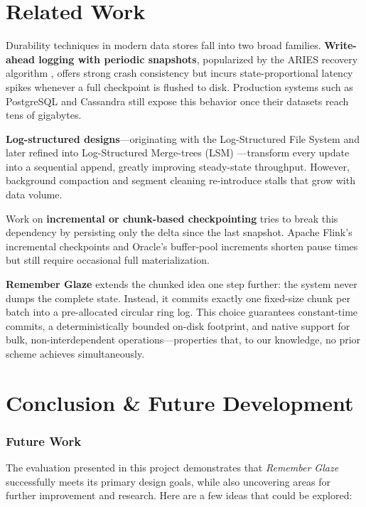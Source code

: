 \documentclass[conference]{IEEEtran}
\begin{document}
\section{Related Work}

Durability techniques in modern data stores fall into two broad families.  
\textbf{Write-ahead logging with periodic snapshots}, popularized by the ARIES
recovery algorithm \cite{mohan1992aries}, offers strong crash consistency but
incurs state-proportional latency spikes whenever a full checkpoint is flushed
to disk. Production systems such as PostgreSQL and Cassandra still expose this behavior once their datasets reach tens of gigabytes.

\textbf{Log-structured designs}—originating with the Log-Structured File
System \cite{rosenblum1992lfs} and later refined into Log-Structured
Merge-trees (LSM) \cite{ongaro2020efficient}—transform every update into a
sequential append, greatly improving steady-state throughput.  However, background
compaction and segment cleaning re-introduce stalls that grow with data volume.

Work on \textbf{incremental or chunk-based checkpointing} tries to break
this dependency by persisting only the delta since the last snapshot.  Apache Flink’s incremental checkpoints \cite{carbone2015flink} and Oracle’s buffer-pool increments \cite{kalantar1998oracle} shorten pause times but still require occasional full materialization.

\textbf{Remember Glaze} extends the chunked idea one step further: the system
never dumps the complete state.  Instead, it commits exactly one fixed-size
chunk per batch into a pre-allocated circular ring log.  This choice guarantees
constant-time commits, a deterministically bounded on-disk footprint, and
native support for bulk, non-interdependent operations—properties that, to our
knowledge, no prior scheme achieves simultaneously.

\section{Conclusion \& Future Development}

\subsubsection*{Future Work}
The evaluation presented in this project demonstrates that \textit{Remember Glaze} successfully meets its primary design goals, while also uncovering areas for further improvement and research. Here are a few ideas that could be explored:
\end{document}
